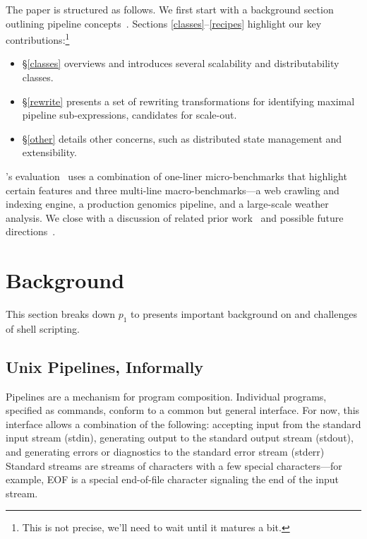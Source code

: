 \documentclass[sigplan,10pt,review,anonymous]{acmart}
\begin{document}
The paper is structured as follows.
We first start with a background section outlining pipeline concepts~.
Sections \ref{classes}--\ref{recipes} highlight our key contributions:\footnote{
  This is not precise, we'll need to wait until it matures a bit.
}
\begin{itemize}

  \item
  \S\ref{classes} overviews \sys and introduces several scalability and distributability classes.

  \item
  \S\ref{rewrite} presents a set of rewriting transformations for identifying maximal pipeline sub-expressions, candidates for scale-out.

  \item
  \S\ref{other} details other concerns, such as distributed state management and extensibility.
\end{itemize}

\noindent
\sys's evaluation~ uses a combination of one-liner micro-benchmarks that highlight certain features and three multi-line macro-benchmarks---a web crawling and indexing engine, a production genomics pipeline, and a large-scale weather analysis.
We close with a discussion of related prior work~ and possible future directions~.

\section{Background}
\label{bg}

This section breaks down $p_1$ to presents important background on and challenges
of shell scripting.

\subsection{Unix Pipelines, Informally}
\label{bg:pipelines}

Pipelines are a mechanism for program composition.
Individual programs, specified as commands, conform to a common but general interface. 
For now, this interface allows a combination of the following:
  accepting input from the standard input stream (stdin),
  generating output to the standard output stream (stdout), and
  generating errors or diagnostics to the standard error stream (stderr)
Standard streams are streams of characters with a few special characters---for example, EOF is a special end-of-file character signaling the end of the input stream.
\end{document}
